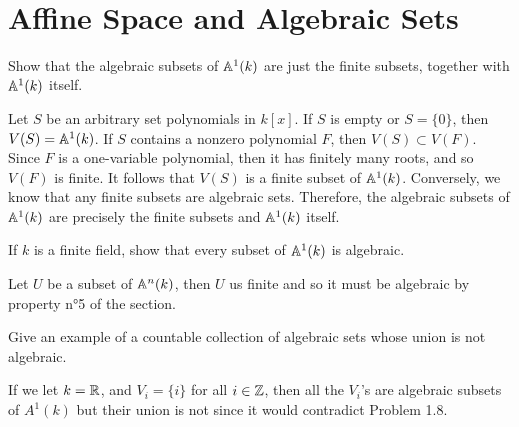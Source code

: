 \begin{exercise}
    \td
\end{exercise}

\begin{solution}
    \td \\
\end{solution}

\section{Affine Space and Algebraic Sets}

\begin{exercise}
    Show that the algebraic subsets of $\mathbb{A}^1(k)$ are just the finite subsets, together with $\mathbb{A}^1(k)$ itself. \\
\end{exercise}

\begin{solution}
    Let $S$ be an arbitrary set polynomials in $k[x]$. If $S$ is empty or $S = \{0\}$, then $V(S) = \mathbb{A}^1(k)$. If $S$ contains a nonzero polynomial $F$, then $V(S) \subset V(F)$. Since $F$ is a one-variable polynomial, then it has finitely many roots, and so $V(F)$ is finite. It follows that $V(S)$ is a finite subset of $\mathbb{A}^1(k)$. Conversely, we know that any finite subsets are algebraic sets. Therefore, the algebraic subsets of $\mathbb{A}^1(k)$ are precisely the finite subsets and $\mathbb{A}^1(k)$ itself. \\
\end{solution}

\begin{exercise}
    If $k$ is a finite field, show that every subset of $\mathbb{A}^1(k)$ is algebraic. \\
\end{exercise}

\begin{solution}
    Let $U$ be a subset of $\mathbb{A}^n(k)$, then $U$ us finite and so it must be algebraic by property n°5 of the section. \\
\end{solution}

\begin{exercise}
    Give an example of a countable collection of algebraic sets whose union is not algebraic. \\
\end{exercise}

\begin{solution}
    If we let $k = \mathbb{R}$, and $V_i = \{i\}$ for all $i \in \mathbb{Z}$, then all the $V_i$'s are algebraic subsets of $A^1(k)$ but their union is not since it would contradict Problem 1.8. \\
\end{solution}

